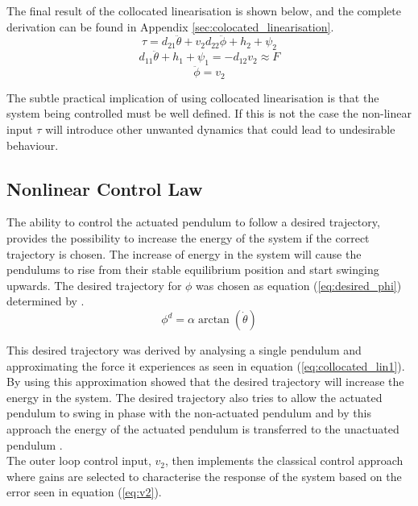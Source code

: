 The final result of the collocated linearisation is shown below, and the complete derivation can be found in Appendix \ref{sec:colocated_linearisation}.
\begin{equation} \label{eq:collocated_lin3}
\tau = d_{21}\ddot{\theta} + v_{2}d_{22}\ddot{\phi} + h_{2} + \psi_{2}
\end{equation}
\begin{equation} \label{eq:collocated_lin1}
d_{11}\ddot{\theta} + h_{1} + \psi_{1} = -d_{12}v_{2} \approx F
\end{equation}
\begin{equation} \label{eq:collocated_lin2}
\ddot{\phi} = v_{2}
\end{equation}

The subtle practical implication of using collocated linearisation is that the system being controlled must be well defined. If this is not the case the non-linear input $\tau$ will introduce other unwanted dynamics that could lead to undesirable behaviour.

\subsection{Nonlinear Control Law}

The ability to control the actuated pendulum to follow a desired trajectory, provides the possibility to increase the energy of the system if the correct trajectory is chosen. The increase of energy in the system will cause the pendulums to rise from their stable equilibrium position and start swinging upwards. The desired trajectory for ${\phi}$ was chosen as equation (\ref{eq:desired_phi}) determined by \citeauthor{spong_swingup}.
\begin{equation} \label{eq:desired_phi}
\phi^{d} =  \alpha \arctan(\dot{\theta})
\end{equation}

This desired trajectory was derived by analysing a single pendulum and approximating the force it experiences as seen in equation (\ref{eq:collocated_lin1}). By using this approximation \citeauthor{spong_swingup} showed that the desired trajectory will increase the energy in the system. The desired trajectory also tries to allow the actuated pendulum to swing in phase with the non-actuated pendulum and by this approach the energy of the actuated pendulum is transferred to the unactuated pendulum \citep{spong_swingup}.\\

The outer loop control input, $v_{2}$, then implements the classical control approach where gains are selected to characterise the response of the system based on the error seen in equation (\ref{eq:v2}). 

